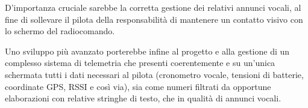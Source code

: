 \documentclass[a4paper, 12pt]{report} %
\begin{document}
D'importanza cruciale sarebbe la corretta gestione dei relativi annunci vocali, al fine di sollevare il pilota della responsabilità di mantenere un contatto visivo con lo schermo del radiocomando.

Uno sviluppo più avanzato porterebbe infine al progetto e alla gestione di un complesso sistema di telemetria che presenti coerentemente e su un'unica schermata tutti i dati necessari al pilota (cronometro vocale, tensioni di batterie, coordinate GPS, RSSI e così via), sia come numeri filtrati da opportune elaborazioni con relative stringhe di testo, che in qualità di annunci vocali.

\clearpage






\end{document}
